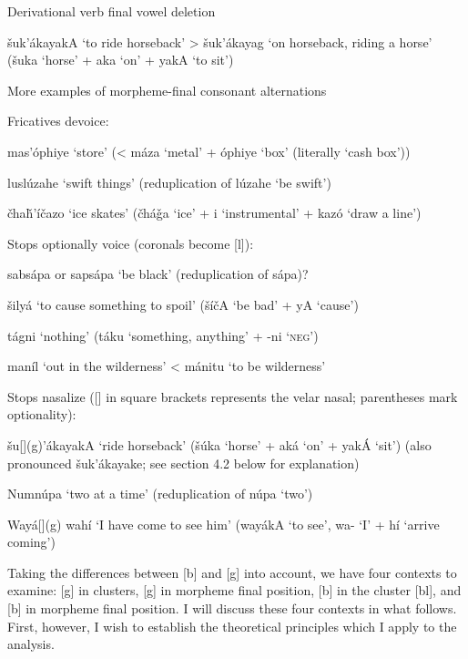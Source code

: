 \documentclass[output=paper]{LSP/langsci}
\begin{document}
\begin{exe}
\ex Derivational verb final vowel deletion

\v{s}uk'\'akayakA `to ride horseback' > \v{s}uk'\'akayag `on horseback, riding a horse' (\v{s}uka `horse' + aka `on' + yakA `to sit')
\end{exe}

\begin{exe}
\ex More examples of morpheme-final consonant alternations
\begin{xlist}
\ex Fricatives devoice:

mas'\'ophiye `store' (< m\'aza `metal' + \'ophiye `box' (literally `cash box'))

lusl\'uzahe `swift things' (reduplication of l\'uzahe `be swift')

\v{c}ha\v{h}'\'i\v{c}azo `ice skates' (\v{c}h\'a\v{g}a `ice' + i `instrumental' + kaz\'o `draw a line')

\ex Stops optionally voice (coronals become [l]):

sabs\'apa or saps\'apa `be black' (reduplication of s\'apa)?

\v{s}ily\'a `to cause something to spoil' (\v{s}\'i\v{c}A `be bad' + yA `cause')

t\'agni `nothing' (t\'aku `something, anything' + -ni `\textsc{neg}')

man\'il `out in the wilderness' < m\'anitu `to be wilderness'

\ex Stops nasalize ([] in square brackets represents the velar nasal; parentheses mark optionality):

\v{s}u[](g)'\'akayakA `ride horseback' (\v{s}\'uka `horse' + ak\'a `on' + yak\'A `sit') (also pronounced \v{s}uk'\'akayake; see section 4.2 below for explanation)

Numn\'upa `two at a time' (reduplication of n\'upa `two')

Way\'a[](g) wah\'i `I have come to see him' (way\'akA `to see', wa- `I' + h\'i `arrive coming')
\end{xlist}
\end{exe}

Taking the differences between [b] and [g] into account, we have four contexts to examine: [g] in clusters, [g] in morpheme final position, [b] in the cluster [bl], and [b] in morpheme final position. I will discuss these four contexts in what follows. First, however, I wish to establish the theoretical principles which I apply to the analysis.
\end{document}
